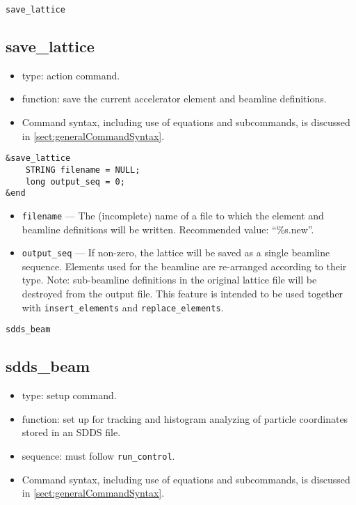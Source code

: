 \documentclass[11pt]{article}
\begin{document}
\newpage
\begin{center}{\Large\verb|save_lattice|}\end{center}
\subsection{save\_lattice \label{subsec:savelattice}}

\begin{itemize}
\item type: action command.
\item function: save the current accelerator element and beamline definitions.
\item Command syntax, including use of equations and subcommands, is discussed in \ref{sect:generalCommandSyntax}.
\end{itemize}

\begin{verbatim}
&save_lattice
    STRING filename = NULL;
    long output_seq = 0;
&end
\end{verbatim}

\begin{itemize}
\item \verb|filename| --- The (incomplete) name of a file to which the element and beamline definitions
will be written.  Recommended value: ``\%s.new''.
\item \verb|output_seq| --- If non-zero, the lattice will be saved as a single beamline sequence.
Elements used for the beamline are re-arranged according to their type. Note: 
sub-beamline definitions in the original lattice file will be destroyed from the output file.
This feature is intended to be used 
together with \verb|insert_elements| and \verb|replace_elements|. 
\end{itemize}

\newpage
\begin{center}{\Large\verb|sdds_beam|}\end{center}
\subsection{sdds\_beam \label{subsec:sddsbeam}}

\begin{itemize}
\item type: setup command.
\item function: set up for tracking and histogram analyzing of particle coordinates stored in an SDDS file.
\item sequence: must follow \verb|run_control|.
\item Command syntax, including use of equations and subcommands, is discussed in \ref{sect:generalCommandSyntax}.
\end{itemize}
\end{document}
